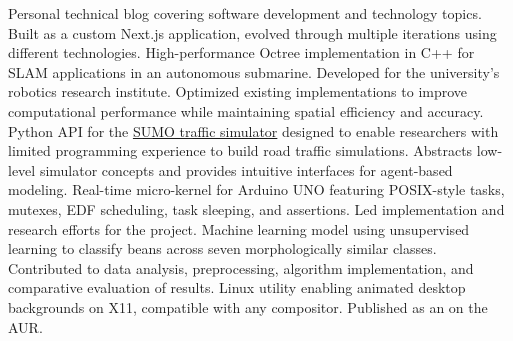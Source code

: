 \documentclass[letterpaper]{twentysecondcv} %
\begin{document}
\begin{twenty}
    {}
    {Personal technical blog covering software development and technology topics.
    Built as a custom Next.js application, evolved through multiple iterations
    using different technologies.}
    {}
    {High-performance Octree implementation in C++ for SLAM applications in an
    autonomous submarine. Developed for the university's robotics research institute.
    Optimized existing implementations to improve computational performance while
    maintaining spatial efficiency and accuracy.}
    {}
    {Python API for the \href{https://www.eclipse.org/sumo/}{SUMO traffic simulator}
    designed to enable researchers with limited programming experience to build
    road traffic simulations. Abstracts low-level simulator concepts and provides
    intuitive interfaces for agent-based modeling.}
    {}
    {Real-time micro-kernel for Arduino UNO featuring POSIX-style tasks, mutexes,
    EDF scheduling, task sleeping, and assertions. Led implementation and research
    efforts for the project.}
    {}
    {Machine learning model using unsupervised learning to classify beans across
    seven morphologically similar classes. Contributed to data analysis, preprocessing,
    algorithm implementation, and comparative evaluation of results.}
    {}
    {Linux utility enabling animated desktop backgrounds on X11, compatible with
    any compositor. Published as an
    on the AUR.}
\end{twenty}

\vfill

\end{document}
